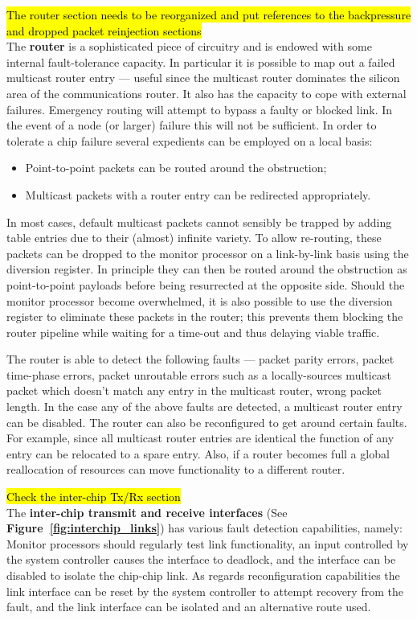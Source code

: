 \documentclass[a4paper, 11pt]{article}
\newenvironment{itmz}{
	\begin{itemize}
		\setlength{\itemsep}{0pt}
		\setlength{\parskip}{0pt}
	}{\end{itemize}}
\newlength\drop
\begin{document}
\hl{The router section needs to be reorganized and put references to the backpressure and dropped packet reinjection sections}\\
The \textbf{router} is a sophisticated piece of circuitry and is endowed with some internal fault-tolerance capacity. In particular it is possible to map out a failed multicast router entry --- useful since the multicast router dominates the silicon area of the communications router. It also has the capacity to cope with external failures. Emergency routing will attempt to bypass a faulty or blocked link. In the event of a node (or larger) failure this will not be sufficient. In order to tolerate a chip failure several expedients can be employed on a local basis:
\begin{itmz}
	\item Point-to-point packets can be routed around the obstruction;
	\item Multicast packets with a router entry can be redirected appropriately.
\end{itmz}
In most cases, default multicast packets cannot sensibly be trapped by adding table entries due to their (almost) infinite variety. To allow re-routing, these packets can be dropped to the monitor processor on a link-by-link basis using the diversion register. In principle they can then be routed around the obstruction as point-to-point payloads before being resurrected at the opposite side. Should the monitor processor become overwhelmed, it is also possible to use the diversion register to eliminate these packets in the router; this prevents them blocking the router pipeline while waiting for a time-out and thus delaying viable traffic.

The router is able to detect the following faults --- packet parity errors, packet time-phase errors, packet unroutable errors such as a locally-sources multicast packet which doesn't match any entry in the multicast router, wrong packet length. In the case any of the above faults are detected, a multicast router entry can be disabled. The router can also be reconfigured to get around certain faults. For example, since all multicast router entries are identical the function of any entry can be relocated to a spare entry. Also, if a router becomes full a global reallocation of resources can move functionality to a different router.

\hl{Check the inter-chip Tx/Rx section}\\
The \textbf{inter-chip transmit and receive interfaces} (See \textbf{Figure~\ref{fig:interchip_links}}) has various fault detection capabilities, namely: Monitor processors should regularly test link functionality, an input controlled by the system controller causes the interface to deadlock, and the interface can be disabled to isolate the chip-chip link. As regards reconfiguration capabilities the link interface can be reset by the system controller to attempt recovery from the fault, and the link interface can be isolated and an alternative route used.
\end{document}

